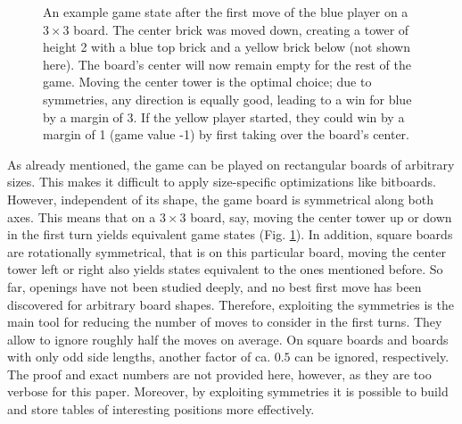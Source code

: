 \documentclass[sigconf]{acmart}
\newcommand{\bl}[1]{\node [circle, minimum size=0.7cm, draw=black, fill=blue!65!white, thin]{{#1}};}
\newcommand{\wh}{\node [rectangle, minimum size=0.7cm, draw=black, fill=yellow] {};}
\begin{document}
\begin{figure}
\begin{center}
\end{center}
\caption{An example game state after the first move of the blue player on a $3\times 3$ board.
The center brick was moved down, creating a tower of height 2 with a blue top brick and a yellow brick below (not shown here).
The board's center will now remain empty for the rest of the game.
Moving the center tower is the optimal choice; due to symmetries, any direction is equally good, leading to a win for blue by a margin of 3.
If the yellow player started, they could win by a margin of 1 (game value -1) by first taking over the board's center.
} \label{fig:example-state}
\end{figure}
As already mentioned, the game can be played on rectangular boards of arbitrary sizes.
This makes it difficult to apply size-specific optimizations like bitboards.
However, independent of its shape, the game board is symmetrical along both axes.
This means that on a $3\times3$ board, say, moving the center tower up or down in the first turn yields equivalent game states (Fig. \ref{fig:example-state}).
In addition, square boards are rotationally symmetrical, that is on this particular board, moving the center tower left or right also yields states equivalent to the ones mentioned before.
So far, openings have not been studied deeply, and no best first move has been discovered for arbitrary board shapes.
Therefore, exploiting the symmetries is the main tool for reducing the number of moves to consider in the first turns.
They allow to ignore roughly half the moves on average.
On square boards and boards with only odd side lengths, another factor of ca. $0.5$ can be ignored, respectively.
The proof and exact numbers are not provided here, however, as they are too verbose for this paper.
Moreover, by exploiting symmetries it is possible to build and store tables of interesting positions more effectively.
\end{document}
